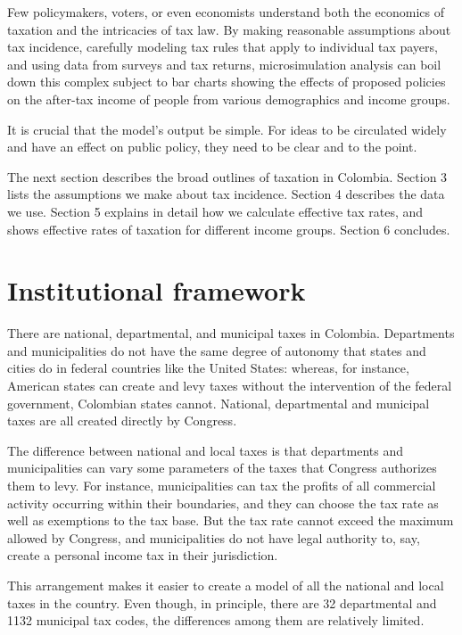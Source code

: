 \documentclass[12pt]{article}
\begin{document}
Few policymakers, voters, or even economists understand both
the economics of taxation
and the intricacies of tax law.
By making reasonable assumptions about tax incidence,
carefully modeling tax rules that apply to individual tax payers,
and using data from surveys and tax returns,
microsimulation analysis can boil down this complex subject to
bar charts showing the effects of proposed policies
on the after-tax income of people from various demographics and income groups.

It is crucial that the model's output be simple.
For ideas to be circulated widely and have an effect on public policy,
they need to be clear and to the point.

The next section describes the broad outlines of taxation in Colombia.
Section 3 lists the assumptions we make about tax incidence.
Section 4 describes the data we use.
Section 5 explains in detail how we calculate effective tax rates,
and shows effective rates of taxation for different income groups.
Section 6 concludes.

\section{Institutional framework}

\iffalse
    [[AN ECONOMIST:
    We should update all the numbers in this section,
    including the tables it references.]]
\fi

There are national, departmental, and municipal taxes in Colombia.
Departments and municipalities do not have the same degree of autonomy
that states and cities do in federal countries like the United States:
whereas, for instance, American states can create and levy taxes
without the intervention of the federal government,
Colombian states cannot.
National, departmental and municipal taxes
are all created directly by Congress.

The difference between national and local taxes
is that departments and municipalities can vary
some parameters of the taxes that Congress authorizes them to levy.
For instance, municipalities can tax the profits of
all commercial activity occurring within their boundaries,
and they can choose the tax rate as well as exemptions to the tax base.
But the tax rate cannot exceed the maximum allowed by Congress,
and municipalities do not have legal authority to, say,
create a personal income tax in their jurisdiction.

This arrangement makes it easier to create a model
of all the national and local taxes in the country.
Even though, in principle,
there are 32 departmental and 1132 municipal tax codes,
the differences among them are relatively limited.
\end{document}
